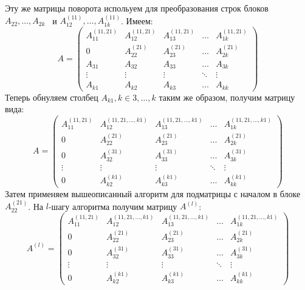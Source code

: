 \documentclass[a4paper, fontsize=14pt]{article}
\begin{document}
		Эту же матрицы поворота испольуем для преобразования строк блоков $A_{22},\dots , A_{2k}$ \, и  $A_{12}^{(11)}, \dots , A_{1k}^{(11)}$.
		Имеем:
		\begin{equation*}
			A = \left(
				\begin{array}{ccccc}
					A_{11}^{(11, 21)} & A_{12}^{(11,21)} & A_{13}^{(11,21)} & \ldots & A_{1k}^{(11,21)}\\
					0				  & A_{22}^{(21)}  	 & A_{23}^{(21)} 	& \ldots & A_{2k}^{(21)}\\
					A_{31} 		 	  & A_{32}		  & A_{33} 		  & \ldots & A_{3k}\\
					\vdots 		  	  & \vdots 		  & \vdots		  & \ddots & \vdots\\
					A_{k1} 		  	  & A_{k2}		  & A_{k3}		  & \ldots & A_{kk}
				\end{array}
			\right)
		\end{equation*}
		Теперь обнуляем столбец $A_{k1}, k \in 3,\dots,k$ таким же образом, получим матрицу вида:
		\begin{equation*}
			A = \left(
				\begin{array}{ccccc}
					A_{11}^{(11, 21)} & A_{12}^{(11,21,\dots,k1)} & A_{13}^{(11,21,\dots,k1)} & \ldots & A_{1k}^{(11,21,\dots,k1)}\\
					0				  & A_{22}^{(21)}  	 		  & A_{23}^{(21)} 			  & \ldots & A_{2k}^{(21)}\\
					0 		 	  	  & A_{32}^{(31)}		  	  & A_{33}^{(31)} 		  	  & \ldots & A_{3k}^{(31)}\\
					\vdots 		  	  & \vdots 		  			  & \vdots		 			  & \ddots & \vdots\\
					0 		  	  	  & A_{k2}^{(k1)}		  	  & A_{k3}^{(k1)}		  	  & \ldots & A_{kk}^{(k1)}
				\end{array}
			\right)
		\end{equation*}
		Затем применяем вышеописанный алгоритм для подматрицы с началом в блоке $A_{22}^{(21)}$. На $l$-шагу алгоритма получим матрицу $A^{(l)}$:
		\begin{equation*}
			A^{(l)} = \left(
				\begin{array}{ccccc}
					A_{11}^{(11, 21)} & A_{12}^{(11,21,\dots,k1)} & A_{13}^{(11,21,\dots,k1)} & \ldots & A_{1k}^{(11,21,\dots,k1)}\\
					0				  & A_{22}^{(21)}  	 		  & A_{23}^{(21)} 			  & \ldots & A_{2k}^{(21)}\\
					0 		 	  	  & A_{32}^{(31)}		  	  & A_{33}^{(31)} 		  	  & \ldots & A_{3k}^{(31)}\\
					\vdots 		  	  & \vdots 		  			  & \vdots		 			  & \ddots & \vdots\\
					0 		  	  	  & A_{k2}^{(k1)}		  	  & A_{k3}^{(k1)}		  	  & \ldots & A_{kk}^{(k1)}
				\end{array}
			\right)
		\end{equation*}
		
\end{document}
